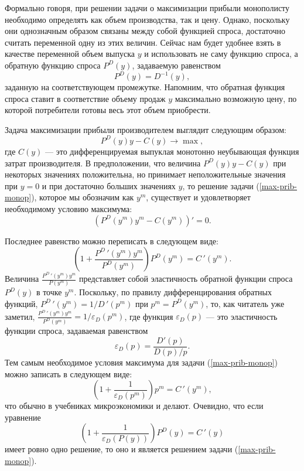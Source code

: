     Формально говоря, при решении задачи о максимизации прибыли
    монополисту необходимо определять как объем производства, так и
    цену. Однако, поскольку они однозначным образом связаны между
    собой функцией спроса, достаточно считать переменной одну из
    этих величин.
    Сейчас нам будет удобнее взять в качестве переменной объем выпуска $y$
    и использовать не саму функцию спроса, а обратную функцию спроса
    $P^{D}(y)$, задаваемую равенством
    \[P^{D}(y)=D^{-1}(y),\]
    заданную на соответствующем промежутке.
    Напомним, что обратная функция спроса ставит в соответствие
    объему продаж $y$ максимально возможную цену, по
    которой потребители готовы весь этот объем приобрести.

    Задача максимизации прибыли производителем выглядит следующим
    образом:
\begin{equation}
\label{max-prib-monop}
    P^{D}(y)y-C(y)\rightarrow\max,
\end{equation}
    где $C(y)$ --- это дифференцируемая выпуклая монотонно
    неубывающая функция затрат производителя.
    В предположении, что величина $P^{D}(y)y-C(y)$ при некоторых значениях
    положительна, но принимает
    неположительные значения при $y=0$ и при достаточно больших
    значениях $y$, то решение задачи (\ref{max-prib-monop}), которое мы
    обозначим как $y^{m}$, существует и удовлетворяет необходимому условию максимума:
    \[(P^{D}(y^{m})y^{m}-C(y^{m}))'=0.\]

    Последнее равенство можно переписать в следующем виде:
    \[\left(1+\frac{P^{D}\,'(y^{m})y^{m}}{P^{D}(y^{m})}\right)P^{D}(y^{m})=C\,'(y^{m}).\]
    Величина $\frac{P^{D}\,'(y^{m})y^{m}}{P(y^{m})}$ представляет собой эластичность
    обратной функции спроса $P^{D}(y)$  в точке $y^{m}$. Поскольку, по правилу
    дифференцирования обратных функций, $P^{D}\,'(y^{m})=1/D\,'(p^{m})$ при
    $p^{m}=P^{D}(y^{m})$, то, как читатель уже заметил,
    $\frac{P^{D}\,'(y^{m})y^{m}}{P^{D}(y^{m})}=1/\varepsilon_{D}(p^{m})$,
    где функция $\varepsilon_{D}(p)$ --- это эластичность функции спроса,
    задаваемая равенством
\[
    \varepsilon_{D}(p)=\frac{D'(p)}{D(p)/p}.
\]
    Тем самым необходимое условия максимума для задачи
    (\ref{max-prib-monop}) можно записать в следующем виде:
\begin{equation}
\label{max-prib-monop1}
    \left(1+\frac{1}{\varepsilon_{D}(p^{m})}\right)p^{m}=C\,'(y^{m}),
\end{equation}
    что обычно в учебниках микроэкономики и делают.
    Очевидно, что если уравнение
    \[\left(1+\frac{1}{\varepsilon_{D}(P(y))}\right)P^{D}(y)=C\,'(y)\]
    имеет ровно одно решение, то оно и является решением задачи
    (\ref{max-prib-monop}).

